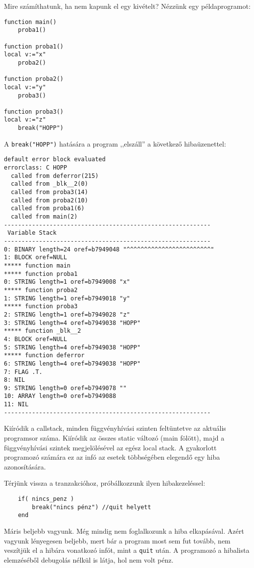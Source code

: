 Mire számíthatunk, ha nem kapunk el egy kivételt? Nézzünk egy példaprogramot:
\begin{verbatim}
function main()
    proba1()

function proba1()    
local v:="x"
    proba2()

function proba2()    
local v:="y"
    proba3()

function proba3()    
local v:="z"
    break("HOPP")
\end{verbatim}

A \verb!break("HOPP")! hatására a program ,,elszáll'' a következő hibaüzenettel:
\begin{verbatim}
default error block evaluated
errorclass: C HOPP
  called from deferror(215)
  called from _blk__2(0)
  called from proba3(14)
  called from proba2(10)
  called from proba1(6)
  called from main(2)
-----------------------------------------------------------
 Variable Stack
-----------------------------------------------------------
0: BINARY length=24 oref=b7949048 "^^^^^^^^^^^^^^^^^^^^^^^^"
1: BLOCK oref=NULL
***** function main
***** function proba1
0: STRING length=1 oref=b7949008 "x"
***** function proba2
1: STRING length=1 oref=b7949018 "y"
***** function proba3
2: STRING length=1 oref=b7949028 "z"
3: STRING length=4 oref=b7949038 "HOPP"
***** function _blk__2
4: BLOCK oref=NULL
5: STRING length=4 oref=b7949038 "HOPP"
***** function deferror
6: STRING length=4 oref=b7949038 "HOPP"
7: FLAG .T.
8: NIL
9: STRING length=0 oref=b7949078 ""
10: ARRAY length=0 oref=b7949088
11: NIL
-----------------------------------------------------------
\end{verbatim}
Kiíródik a callstack, minden függvényhívási szinten feltüntetve 
az aktuális programsor száma.
Kiíródik az összes static változó (main fölött), 
majd a függvényhívási szintek megjelölésével az egész local stack.
A gyakorlott programozó számára ez az infó az esetek többségében elegendő
egy hiba azonosítására.

Térjünk vissza a tranzakcióhoz, próbálkozzunk ilyen hibakezeléssel:
\begin{verbatim}
    if( nincs_penz )
        break("nincs pénz") //quit helyett
    end
\end{verbatim}
Máris beljebb vagyunk.
Még mindig nem foglalkozunk a hiba elkapásával.
Azért vagyunk lényegesen beljebb, mert bár a program most sem fut tovább,
nem veszítjük el a hibára vonatkozó infót, mint a \verb!quit! után.
A programozó a hibalista elemzéséből debugolás nélkül is látja, hol
nem volt pénz.

